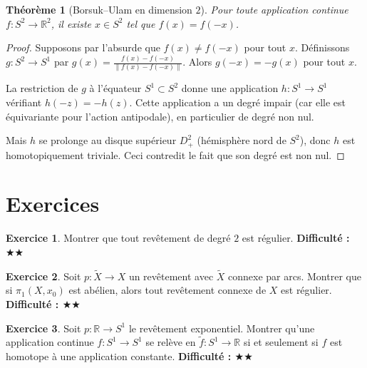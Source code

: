 \documentclass[12pt,a4paper,openany]{book}
\theoremstyle{definition}
\newtheorem{exercice}{Exercice}[chapter]
\theoremstyle{plain}
\newtheorem{theoreme}[definition]{Théorème}
\theoremstyle{remark}
\newcommand{\R}{\mathbb{R}}
\begin{document}
\begin{theoreme}[Borsuk--Ulam en dimension $2$]\label{thm:borsuk-ulam-2}
Pour toute application continue $f \colon S^2 \to \R^2$, il existe $x \in S^2$ tel que
$f(x) = f(-x)$.
\end{theoreme}

\begin{proof}
Supposons par l'absurde que $f(x) \neq f(-x)$ pour tout $x$. Définissons
$g \colon S^2 \to S^1$ par $g(x) = \frac{f(x) - f(-x)}{\|f(x) - f(-x)\|}$.
Alors $g(-x) = -g(x)$ pour tout $x$.

La restriction de $g$ à l'équateur $S^1 \subset S^2$ donne une application
$h \colon S^1 \to S^1$ vérifiant $h(-z) = -h(z)$. Cette application a un degré impair
(car elle est équivariante pour l'action antipodale), en particulier de degré non nul.

Mais $h$ se prolonge au disque supérieur $D^2_+$ (hémisphère nord de $S^2$), donc $h$ est
homotopiquement triviale. Ceci contredit le fait que son degré est non nul.
\end{proof}

\section{Exercices}\label{sec:exo-rev}

\begin{exercice}\label{exo:rev-degre-2}
Montrer que tout revêtement de degré $2$ est régulier.
\textbf{Difficulté : \(\bigstar\bigstar\)}
\end{exercice}

\begin{exercice}\label{exo:rev-sous-groupe}
Soit $p \colon \widetilde{X} \to X$ un revêtement avec $\widetilde{X}$ connexe par arcs.
Montrer que si $\pi_1(X, x_0)$ est abélien, alors tout revêtement connexe de $X$ est régulier.
\textbf{Difficulté : \(\bigstar\bigstar\)}
\end{exercice}

\begin{exercice}\label{exo:relevement-applications}
Soit $p \colon \R \to S^1$ le revêtement exponentiel. Montrer qu'une application continue
$f \colon S^1 \to S^1$ se relève en $\tilde{f} \colon S^1 \to \R$ si et seulement si
$f$ est homotope à une application constante.
\textbf{Difficulté : \(\bigstar\bigstar\)}
\end{exercice}
\end{document}
